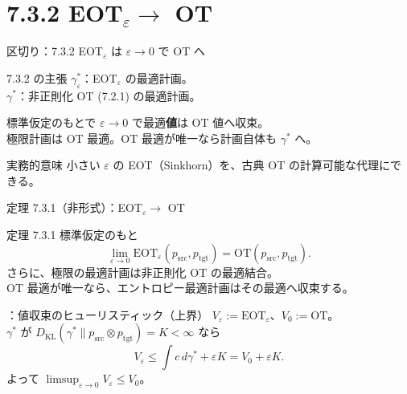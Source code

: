 \section{7.3.2 EOT$_\varepsilon\to$ OT}
\asmain
\begin{frame}{区切り：7.3.2 EOT$_\varepsilon$ は $\varepsilon\to 0$ で OT へ}
    \tableofcontents[currentsection]
\end{frame}
\asmain
\begin{frame}{7.3.2 の主張}
    $\gamma_\varepsilon^*$：EOT$_\varepsilon$ の最適計画。\\
    $\gamma^*$：非正則化 OT (7.2.1) の最適計画。
    \begin{block}{標準仮定のもとで}
        $\varepsilon\to 0$ で最適\textbf{値}は OT 値へ収束。\\
        極限計画は OT 最適。OT 最適が唯一なら計画自体も $\gamma^*$ へ。
    \end{block}
    \begin{exampleblock}{実務的意味}
        小さい $\varepsilon$ の EOT（Sinkhorn）を、古典 OT の計算可能な代理にできる。
    \end{exampleblock}
\end{frame}
\asmain
\begin{frame}{定理 7.3.1（非形式）：EOT$_\varepsilon\to$ OT}
    \begin{block}{定理 7.3.1}
        標準仮定のもと
        \[
            \lim_{\varepsilon\to 0}
            \mathrm{EOT}_\varepsilon(p_{\mathrm{src}},p_{\mathrm{tgt}})
            =
            \mathrm{OT}(p_{\mathrm{src}},p_{\mathrm{tgt}}).
        \]
        さらに、極限の最適計画は非正則化 OT の最適結合。\\
        OT 最適が唯一なら、エントロピー最適計画はその最適へ収束する。
    \end{block}
\end{frame}
\assuppl
\begin{frame}{\supplmark：値収束のヒューリスティック（上界）}
    $V_\varepsilon:=\mathrm{EOT}_\varepsilon$、$V_0:=\mathrm{OT}$。\\
    $\gamma^*$ が $D_{\mathrm{KL}}(\gamma^*\|p_{\mathrm{src}}\otimes p_{\mathrm{tgt}})=K<\infty$ なら
    \[
        V_\varepsilon
        \le
        \int c\,d\gamma^*
        +
        \varepsilon K
        =
        V_0+\varepsilon K.
    \]
    よって $\limsup_{\varepsilon\to 0} V_\varepsilon\le V_0$。
\end{frame}
